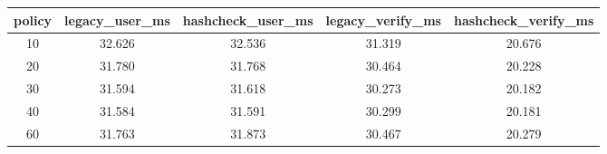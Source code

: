 \begin{tabular}{c c c c c}
\toprule
policy & legacy\_user\_ms & hashcheck\_user\_ms & legacy\_verify\_ms & hashcheck\_verify\_ms \\
\midrule
10 & 32.626 & 32.536 & 31.319 & 20.676 \\
20 & 31.780 & 31.768 & 30.464 & 20.228 \\
30 & 31.594 & 31.618 & 30.273 & 20.182 \\
40 & 31.584 & 31.591 & 30.299 & 20.181 \\
60 & 31.763 & 31.873 & 30.467 & 20.279 \\
\bottomrule
\end{tabular}
